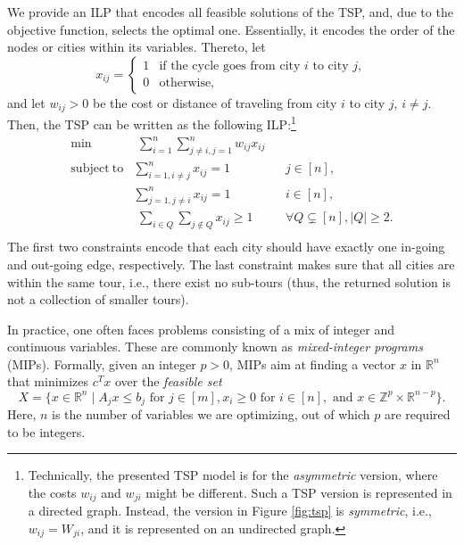 \documentclass[twoside,11pt]{article}
\newcommand{\bbR}{\ensuremath{\mathbb{R}}}
\newcommand{\bbZ}{\ensuremath{\mathbb{Z}}}
\begin{document}
\begin{example}
	\label{example:tsp}
	We provide an ILP that encodes all feasible solutions of the TSP, and, due to the objective function, selects the optimal one. Essentially, it encodes the order of the nodes or cities within its variables. Thereto, let
	$$x_{ij} = \begin{cases} 1 & \text{if the cycle goes from city } i \text{ to city } j, \\ 0 & \text{otherwise,} \end{cases}$$
	and let $w_{ij} > 0$ be the cost or distance of traveling from city $i$ to city $j$, $i\neq j$. Then, the TSP can be written as the following ILP:\footnote{Technically, the presented TSP model is for the \emph{asymmetric} version, where the costs $w_{ij}$ and $w_{ji}$ might be different. Such a TSP version is represented in a directed graph. Instead, the version in Figure \ref{fig:tsp} is \emph{symmetric}, i.e., $w_{ij}=W_{ji}$, and it is represented on an undirected graph.}
	\begin{align*}
		\min                 & \,\,\sum_{i=1}^n \sum_{j\ne i,j=1}^n w_{ij}x_{ij}          &  &                                       \\
		\mathrm{subject\ to} & \sum_{i=1,i\ne j}^n x_{ij} = 1                             &  & j \in [n],                            \\
		                     & \sum_{j=1,j\ne i}^n x_{ij} = 1                             &  & i \in [n],                            \\
		                     & \,\,\sum_{i \in Q}{\sum_{j \not \in Q}{x_{ij}}} \geq 1 &  & \forall Q \subsetneq [n], |Q| \geq 2. \\
	\end{align*}
	The first two constraints encode that each city should have exactly one in-going and out-going edge, respectively. The last constraint makes sure that all cities are within the same tour, i.e., there exist no sub-tours (thus, the returned solution is not a collection of smaller tours).
\end{example}

In practice, one often faces problems consisting of a mix of integer and continuous variables. These are commonly known as \emph{mixed-integer programs} (MIPs). Formally, given an integer $p > 0$, MIPs aim at finding a vector $x$ in $\bbR^{n}$ that minimizes $c^T x$ over the \emph{feasible set} %
\begin{equation*}
	X = \{ x \in \bbR^n \mid A_j x \leq b_j \text{ for } j \in [m], x_i \geq 0 \text{ for } i \in [n], \text{ and } x \in \bbZ^{p} \times \bbR^{n-p}  \}.
\end{equation*} %
Here, $n$ is the number of variables we are optimizing, out of which $p$ are required to be integers.
\end{document}
